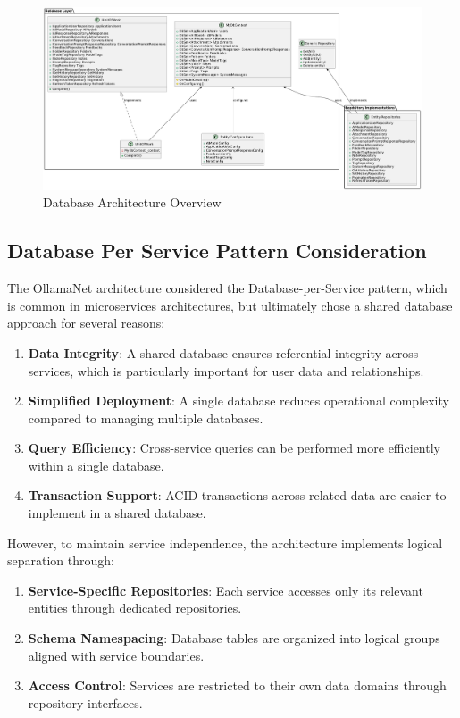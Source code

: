 \begin{figure}[p]
    \centering
    \includegraphics[width=\textwidth]{./Chapter05/figures/database_architecture.png}
    \caption{Database Architecture Overview}
    \label{fig:database-architecture}
\end{figure}
\clearpage

\subsection{Database Per Service Pattern Consideration}

The OllamaNet architecture considered the Database-per-Service pattern, which is common in microservices architectures, but ultimately chose a shared database approach for several reasons:

\begin{enumerate}
   \item \textbf{Data Integrity}: A shared database ensures referential integrity across services, which is particularly important for user data and relationships.

   \item \textbf{Simplified Deployment}: A single database reduces operational complexity compared to managing multiple databases.

   \item \textbf{Query Efficiency}: Cross-service queries can be performed more efficiently within a single database.

   \item \textbf{Transaction Support}: ACID transactions across related data are easier to implement in a shared database.
\end{enumerate}

However, to maintain service independence, the architecture implements logical separation through:

\begin{enumerate}
   \item \textbf{Service-Specific Repositories}: Each service accesses only its relevant entities through dedicated repositories.

   \item \textbf{Schema Namespacing}: Database tables are organized into logical groups aligned with service boundaries.

   \item \textbf{Access Control}: Services are restricted to their own data domains through repository interfaces.
\end{enumerate}

